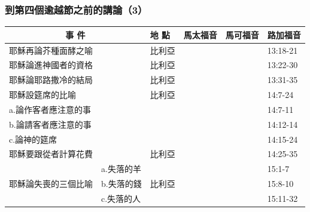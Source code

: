 \subsubsection{到第四個逾越節之前的講論（3）}
\begin{table}[htbp]
  \centering
    \begin{tabular}{|p{5.93em}l|p{4.215em}|r|r|p{5.855em}|}
    \toprule
    \multicolumn{2}{|c|}{\textbf{事 件}} & \textbf{地 點} & \multicolumn{1}{p{5.215em}|}{\textbf{馬太福音}} & \multicolumn{1}{p{5.07em}|}{\textbf{馬可福音}} & \textbf{路加福音} \\
    \midrule
    \multicolumn{2}{|p{12.145em}|}{耶穌再論芥種面酵之喻} & 比利亞   &       &       & 13:18-21 \\
    \midrule
    \multicolumn{2}{|p{12.145em}|}{耶穌論進神國者的資格} & 比利亞   &       &       & 13:22-30 \\
    \midrule
    \multicolumn{2}{|p{12.145em}|}{耶穌論耶路撒冷的結局} & 比利亞   &       &       & 13:31-35 \\
    \midrule
    \multicolumn{2}{|p{12.145em}|}{耶穌設筵席的比喻} & 比利亞   &       &       & 14:7-24 \\
    \midrule
    \multicolumn{2}{|p{12.145em}|}{a.論作客者應注意的事} & \multicolumn{1}{r|}{} &       &       & 14:7-11 \\
    \midrule
    \multicolumn{2}{|p{12.145em}|}{b.論請客者應注意的事} & \multicolumn{1}{r|}{} &       &       & 14:12-14 \\
    \midrule
    \multicolumn{2}{|p{12.145em}|}{c.論神的筵席} & \multicolumn{1}{r|}{} &       &       & 14:15-24 \\
    \midrule
    \multicolumn{2}{|p{12.145em}|}{耶穌要跟從者計算花費} & 比利亞   &       &       & 14:25-35 \\
    \midrule
    \multicolumn{1}{|c|}{\multirow{3}[6]{*}{耶穌論失喪的三個比喻}} & \multicolumn{1}{p{6.215em}|}{a.失落的羊} & \multirow{3}[6]{*}{比利亞} &       &       & 15:1-7 \\
\cmidrule{2-2}\cmidrule{4-6}    \multicolumn{1}{|c|}{} & \multicolumn{1}{p{6.215em}|}{b.失落的錢} & \multicolumn{1}{c|}{} &       &       & 15:8-10 \\
\cmidrule{2-2}\cmidrule{4-6}    \multicolumn{1}{|c|}{} & \multicolumn{1}{p{6.215em}|}{c.失落的人} & \multicolumn{1}{c|}{} &       &       & 15:11-32 \\
    \midrule

\end{tabular}
\end{table}
